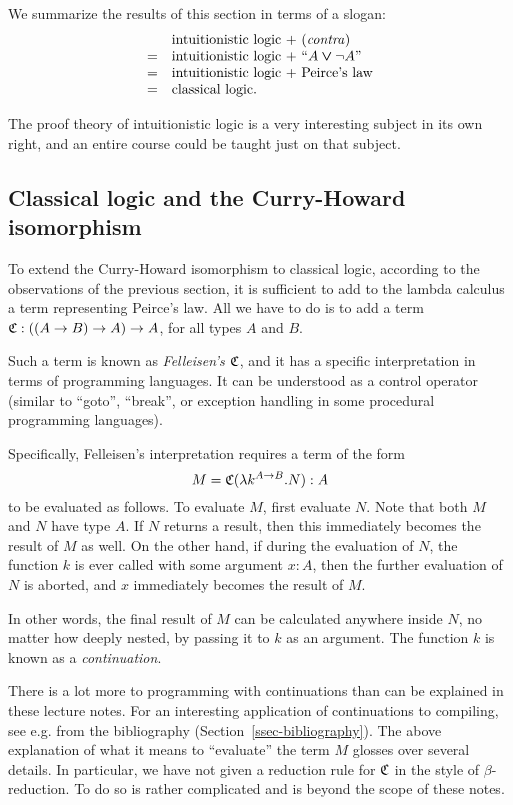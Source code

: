 \documentclass{article}
\begin{document}
We summarize the results of
this section in terms of a slogan:
\[ \begin{array}{ll}
  &  \mbox{intuitionistic logic + \textrm{(\textit{contra\/})}} \\
  =& \mbox{intuitionistic logic + ``$A\mathbin{\textrm{\rm\boldmath $\vee$}}\neg A$''} \\
  =& \mbox{intuitionistic logic + Peirce's law} \\
  =& \mbox{classical logic.}
\end{array}
\]

The proof theory of intuitionistic logic is a very interesting subject
in its own right, and an entire course could be taught just on that
subject.

\subsection{Classical logic and the Curry-Howard isomorphism}

To extend the Curry-Howard isomorphism to classical logic, according
to the observations of the previous section, it is sufficient to add
to the lambda calculus a term representing Peirce's law. All we have
to do is to add a term $\mathfrak{C}:((A\to B)\to A)\to A$, for all types $A$
and $B$. 

Such a term is known as {\em Felleisen's $\mathfrak{C}$}, and it has a specific
interpretation in terms of programming languages. It can be understood
as a control operator (similar to ``goto'', ``break'', or exception
handling in some procedural programming languages).

Specifically, Felleisen's interpretation requires a term of the form
\[ M = \mathfrak{C}(\lambda k^{A\to B}.N) : A
\]
to be evaluated as follows. To evaluate $M$, first evaluate $N$.  Note
that both $M$ and $N$ have type $A$. If $N$ returns a result, then
this immediately becomes the result of $M$ as well. On the other hand,
if during the evaluation of $N$, the function $k$ is ever called with
some argument $x:A$, then the further evaluation of $N$ is aborted,
and $x$ immediately becomes the result of $M$.

In other words, the final result of $M$ can be calculated anywhere
inside $N$, no matter how deeply nested, by passing it to $k$ as an
argument. The function $k$ is known as a {\em continuation}.

There is a lot more to programming with continuations than can be
explained in these lecture notes. For an interesting application of
continuations to compiling, see e.g. {\cite{App92}} from the
bibliography (Section~\ref{ssec-bibliography}). The above explanation
of what it means to ``evaluate'' the term $M$ glosses over several
details.  In particular, we have not given a reduction rule for $\mathfrak{C}$
in the style of $\beta$-reduction. To do so is rather complicated and
is beyond the scope of these notes.
\end{document}
